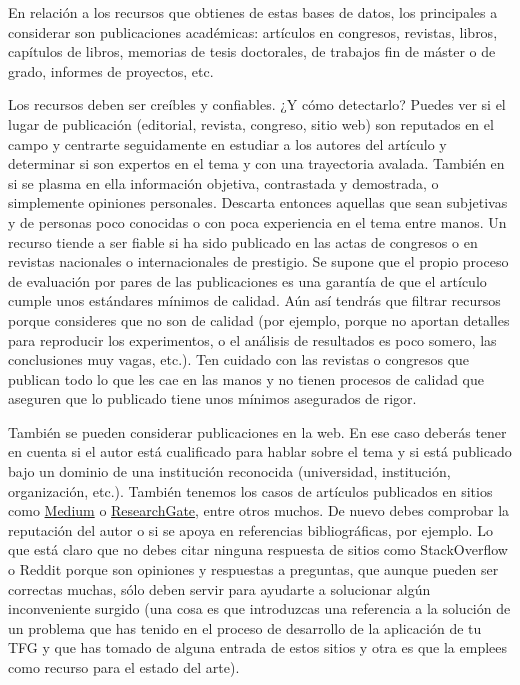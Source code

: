 En relación a los recursos que obtienes de estas bases de datos, los principales a considerar son publicaciones académicas: artículos en congresos, revistas, libros, capítulos de libros, memorias de tesis doctorales, de trabajos fin de máster o de grado, informes de proyectos, etc. 

Los recursos deben ser creíbles y confiables. ¿Y cómo detectarlo? Puedes ver si el lugar de publicación (editorial, revista, congreso, sitio web) son reputados en el campo y centrarte seguidamente en estudiar a los autores del artículo y determinar si son expertos en el tema y con una trayectoria avalada. También en si se plasma en ella información objetiva, contrastada y demostrada, o simplemente opiniones personales. Descarta entonces aquellas que sean subjetivas y de personas poco conocidas o con poca experiencia en el tema entre manos.  Un recurso tiende a ser fiable si ha sido publicado en las actas de congresos o en revistas nacionales o internacionales de prestigio. Se supone que el propio proceso de evaluación por pares de las publicaciones es una garantía de que el artículo cumple unos estándares mínimos de calidad. Aún así tendrás que filtrar recursos porque consideres que no son de calidad (por ejemplo, porque no aportan detalles para reproducir los experimentos, o el análisis de resultados es poco somero, las conclusiones muy vagas, etc.). Ten cuidado con las revistas o congresos que publican todo lo que les cae en las manos y no tienen procesos de calidad que aseguren que lo publicado tiene unos mínimos asegurados de rigor.

También se pueden considerar publicaciones en la web. En ese caso deberás tener en cuenta si el autor está cualificado para hablar sobre el tema y si está publicado bajo un dominio de una institución reconocida (universidad, institución, organización, etc.). También tenemos los casos de artículos publicados en sitios como \href{www.medium.com}{Medium} o \href{www.researchgate.net}{ResearchGate}, entre otros muchos. De nuevo debes comprobar la reputación del autor o si se apoya en referencias bibliográficas, por ejemplo. Lo que está claro que no debes citar ninguna respuesta de sitios como StackOverflow o Reddit porque son opiniones y respuestas a preguntas, que aunque pueden ser correctas muchas, sólo deben servir para ayudarte a solucionar algún inconveniente surgido (una cosa es que introduzcas una referencia a la solución de un problema que has tenido en el proceso de desarrollo de la aplicación de tu TFG y que has tomado de alguna entrada de estos sitios y otra es que la emplees como recurso para el estado del arte).

